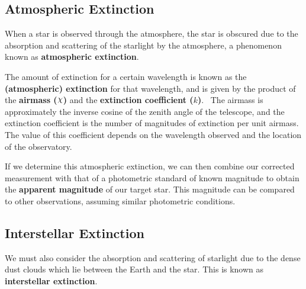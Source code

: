 
\subsection{Atmospheric Extinction}\label{cha:InfraredDataReductionTechniques:sec:MagnitudeScale:subsec:AtmosphericExtinction}

When a star is observed through the atmosphere, the star is obscured
due to the absorption and scattering of the starlight by the
atmosphere, a phenomenon known as \textbf{atmospheric extinction}. %

\vspace{\myparskip}

The amount of extinction for a certain wavelength is known as the \textbf{(atmospheric) extinction} %
for that wavelength, and is given by the product of the
\textbf{airmass ($\Chi$)}\label{cha:InfraredDataReductionTechniques:sec:MagnitudeScale:subsec:AtmosphericExtinction:topic:k}
and the \textbf{extinction coefficient ($k$)}.%
\ The airmass is approximately the inverse cosine of the zenith angle of
the telescope, and the extinction coefficient is the number of
magnitudes of extinction per unit airmass. The value of this coefficient depends on
the wavelength observed and the location of the observatory. %

\vspace{\myparskip}

If we determine this atmospheric extinction, we can then combine our corrected measurement with that of a photometric standard of known magnitude to obtain the \textbf{apparent
magnitude} %
of our target star. This magnitude can be compared to other observations, assuming similar photometric conditions. %


\subsection{Interstellar Extinction}\label{cha:InfraredDataReductionTechniques:sec:MagnitudeScale:subsec:InterstellarExtinction}

We must also consider the absorption and scattering of starlight due to the
dense dust clouds which lie between the Earth and the star. This is
known as \textbf{interstellar extinction}. %

\vspace{\myparskip}

